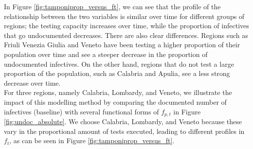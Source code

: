 \documentclass[12pt]{article}
\begin{document}
	In Figure \ref{fig:tamponiprop_versus_ft}, we can see that the profile of the relationship between the two variables is similar over time for different groups of regions; the testing capacity increases over time, while the proportion of infectives that go undocumented decreases. There are also clear differences. Regions such as Friuli Venezia Giulia and Veneto have been testing a higher proportion of their population over time and see a steeper decrease in the proportion of undocumented infectives. On the other hand, regions that do not test a large proportion of the population, such as Calabria and Apulia, see a less strong decrease over time.
	\\
	
	For three regions, namely Calabria, Lombardy, and Veneto, we illustrate the impact of this modelling method by comparing the documented number of infectives (baseline) with several functional forms of $f_{p,t}$ in Figure \ref{fig:undoc_absolute}. We choose Calabria, Lombardy, and Veneto because these vary in the proportional amount of tests executed, leading to different profiles in $f_t$, as can be seen in Figure \ref{fig:tamponiprop_versus_ft}.
	
\end{document}

